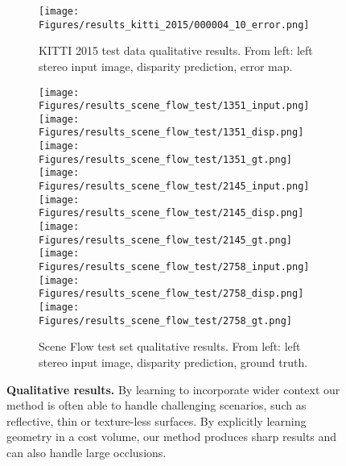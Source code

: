 \documentclass[10pt,twocolumn,letterpaper]{article}
\begin{document}
\begin{figure*}[p]
\begin{center}
\begin{subfigure}[t]{\linewidth}
			\texttt{[image: Figures/results\_kitti\_2015/000004\_10\_error.png]}
	        \caption{KITTI 2015 test data qualitative results. From left: left stereo input image, disparity prediction, error map.}
            \vspace{2 mm}
		\end{subfigure}
    		\begin{subfigure}[t]{\linewidth}
            \centering
			\texttt{[image: Figures/results\_scene\_flow\_test/1351\_input.png]}
			\texttt{[image: Figures/results\_scene\_flow\_test/1351\_disp.png]}
			\texttt{[image: Figures/results\_scene\_flow\_test/1351\_gt.png]}
            \vspace{1 mm}
			\texttt{[image: Figures/results\_scene\_flow\_test/2145\_input.png]}
			\texttt{[image: Figures/results\_scene\_flow\_test/2145\_disp.png]}
			\texttt{[image: Figures/results\_scene\_flow\_test/2145\_gt.png]}
            \vspace{1 mm}
			\texttt{[image: Figures/results\_scene\_flow\_test/2758\_input.png]}
			\texttt{[image: Figures/results\_scene\_flow\_test/2758\_disp.png]}
			\texttt{[image: Figures/results\_scene\_flow\_test/2758\_gt.png]}
	        \caption{Scene Flow test set qualitative results. From left: left stereo input image, disparity prediction, ground truth.}
		\end{subfigure}
	\end{center}
	\caption{\textbf{Qualitative results.} By learning to incorporate wider context our method is often able to handle challenging scenarios, such as reflective, thin or texture-less surfaces. By explicitly learning geometry in a cost volume, our method produces sharp results and can also handle large occlusions.}
	\label{fig:results_qualitative}
\end{figure*}
\end{document}
